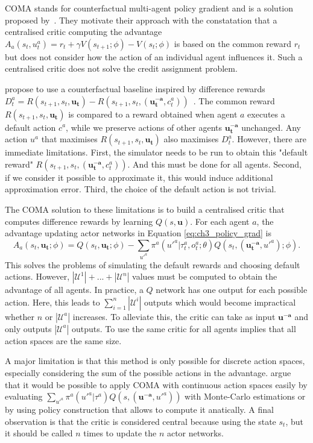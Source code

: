 COMA stands for counterfactual multi-agent policy gradient and is a solution proposed by~\cite{foerster2017coma}.
They motivate their approach with the constatation that a centralised critic computing the advantage $A_a(s_t, u^a_t) = r_t + \gamma V(s_{t+1}; \phi) - V(s_t; \phi)$ is based on the common reward $r_t$ but does not consider how the action of an individual agent influences it.
Such a centralised critic does not solve the credit assignment problem.

\cite{foerster2017coma} propose to use a counterfactual baseline inspired by difference rewards $D_t^a=R(s_{t+1}, s_t, \mathbf{u_t}) - R(s_{t+1}, s_t, (\mathbf{u_t^{-a}}, c_t^a))$~\citep{wolpert2001optimal}.
The common reward $R(s_{t+1}, s_t, \mathbf{u_t})$ is compared to a reward obtained when agent $a$ executes a default action $c^a$, while we preserve actions of other agents $\mathbf{u_t^{-a}}$ unchanged.
Any action $u^a$ that maximises $R(s_{t+1}, s_t, \mathbf{u_t})$ also maximises $D_t^a$.
However, there are immediate limitations.
First, the simulator needs to be run to obtain this "default reward" $R(s_{t+1}, s_t, (\mathbf{u_t^{-a}}, c_t^a))$.
And this must be done for all agents.
Second, if we consider it possible to approximate it, this would induce additional approximation error.
Third, the choice of the default action is not trivial.

The COMA solution to these limitations is to build a centralised critic that computes difference rewards by learning $Q(s, \mathbf{u})$.
For each agent $a$, the advantage updating actor networks in Equation \ref{eq:ch3_policy_grad} is 
\begin{equation}
\label{eq:ch3_coma_adv}
A_a(s_t,\mathbf{u_t}; \phi)=Q(s_t, \mathbf{u_t};\phi) - \sum_{u'^{a}} \pi^a({u'^{a}} |\tau_t^a, o_t^a;\theta) Q(s_t, (\mathbf{u_t^{-a}}, u'^{a}); \phi).
\end{equation}
This solves the problems of simulating the default rewards and choosing default actions.
However, $|\mathcal{U}^1|+...+|\mathcal{U}^n|$ values must be computed to obtain the advantage of all agents.
In practice, a $Q$ network has one output for each possible action.
Here, this leads to $\sum_{i=1}^n|\mathcal{U}^i|$ outputs which would become impractical whether $n$ or $|\mathcal{U}^a|$ increases.
To alleviate this, the critic can take as input $\mathbf{u^{-a}}$ and only outputs $|\mathcal{U}^a|$ outputs.
To use the same critic for all agents implies that all action spaces are the same size.

A major limitation is that this method is only possible for discrete action spaces, especially considering the sum of the possible actions in the advantage.
\cite{foerster2017coma} argue that it would be possible to apply COMA with continuous action spaces easily by evaluating $\sum_{u'^{a}} \pi^a(u'^{a}|\tau^a) Q(s,(\mathbf{u^{-a}},u'^{a}))$ with Monte-Carlo estimations or by using policy construction that allows to compute it anatically.
A final observation is that the critic is considered central because using the state $s_t$, but it should be called $n$ times to update the $n$ actor networks.

